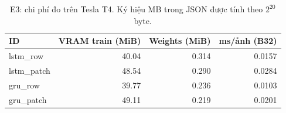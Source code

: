 \begin{table}[htbp]
\centering\small
\caption{E3: chi phí đo trên Tesla T4. Ký hiệu MB trong JSON được tính theo $2^{20}$ byte.}\label{tab:costE3}
\begin{lrbox}{\reporttable}\begin{tabular}{lrrr}
\toprule
ID & VRAM train (MiB) & Weights (MiB) & ms/ảnh (B32) \\
\midrule
lstm\_row & 40.04 & 0.314 & 0.0157 \\
lstm\_patch & 48.54 & 0.290 & 0.0284 \\
gru\_row & 39.77 & 0.236 & 0.0103 \\
gru\_patch & 49.11 & 0.219 & 0.0201 \\
\bottomrule
\end{tabular}\end{lrbox}
\ifdim\wd\reporttable>\linewidth\resizebox{\linewidth}{!}{\usebox{\reporttable}}\else\usebox{\reporttable}\fi
\end{table}
